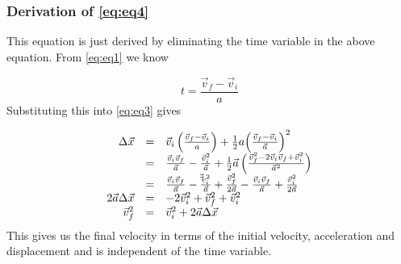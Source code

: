             \subsubsection*{Derivation of  \ref{eq:eq4}}
            \nopagebreak
          \label{m38796*id77086}This equation is just derived by eliminating the time variable in the above equation. From   \ref{eq:eq1} we know\par 
          \label{m38796*id77095}\nopagebreak\noindent{}
            
    \begin{equation*}
    t=\frac{\vec{v}_{f}-\vec{v}_{i}}{a}
      \end{equation*}
          \label{m38796*id77132}Substituting this into  \ref{eq:eq3} gives\par 
          \label{m38796*uid139}\nopagebreak\noindent{}
            
    \begin{equation*}
    \begin{array}{ccc}
\hfill \Delta \vec{x}& =& \vec{v}_{i}\left(\frac{\vec{v}_{f}-\vec{v}_{i}}{a}\right)+\frac{1}{2}a{\left(\frac{\vec{v}_{f}-\vec{v}_{i}}{\vec{a}}\right)}^{2}\hfill \\ 
& =& \frac{\vec{v}_{i}\vec{v}_{f}}{\vec{a}} - \frac{\vec{v}_{i}^{2}}{\vec{a}}+\frac{1}{2}\vec{a}\left(\frac{\vec{v}_{f}^{2}-2\vec{v}_{i}\vec{v}_{f}+\vec{v}_{i}^{2}}{\vec{a}^{2}}\right)\hfill \\ 
& =& \frac{\vec{v}_{i}\vec{v}_{f}}{\vec{a}}-\frac{\vec\vec{v}_{i}^{2}}{\vec{a}}+\frac{\vec{v}_{f}^{2}}{2\vec{a}}-\frac{\vec{v}_{i}\vec{v}_{f}}{\vec{a}}+\frac{\vec{v}_{i}^{2}}{2\vec{a}}\hfill \\
 \hfill 2\vec{a}\Delta \vec{x}& =& -2\vec{v}_{i}^{2}+\vec{v}_{f}^{2}+\vec{v}_{i}^{2}\hfill \\ \hfill \vec{v}_{f}^{2}& =& \vec{v}_{i}^{2}+2\vec{a}\Delta \vec{x}\hfill
 \end{array}
      \end{equation*}
          \label{m38796*id77586}This gives us the final velocity in terms of the initial velocity, acceleration and displacement and is independent of the time variable.\par 
\label{m38796*secfhsst!!!underscore!!!id4852}
      \noindent
